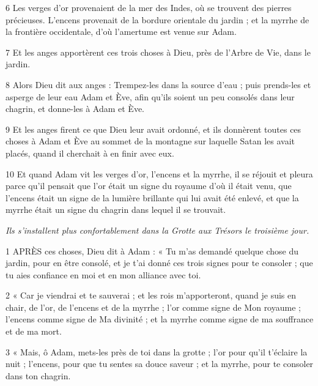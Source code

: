 \par 6 Les verges d'or provenaient de la mer des Indes, où se trouvent des pierres précieuses. L'encens provenait de la bordure orientale du jardin ; et la myrrhe de la frontière occidentale, d'où l'amertume est venue sur Adam.

\par 7 Et les anges apportèrent ces trois choses à Dieu, près de l'Arbre de Vie, dans le jardin.

\par 8 Alors Dieu dit aux anges : Trempez-les dans la source d'eau ; puis prends-les et asperge de leur eau Adam et Ève, afin qu'ils soient un peu consolés dans leur chagrin, et donne-les à Adam et Ève.

\par 9 Et les anges firent ce que Dieu leur avait ordonné, et ils donnèrent toutes ces choses à Adam et Ève au sommet de la montagne sur laquelle Satan les avait placés, quand il cherchait à en finir avec eux.

\par 10 Et quand Adam vit les verges d'or, l'encens et la myrrhe, il se réjouit et pleura parce qu'il pensait que l'or était un signe du royaume d'où il était venu, que l'encens était un signe de la lumière brillante qui lui avait été enlevé, et que la myrrhe était un signe du chagrin dans lequel il se trouvait.


\par \textit{Ils s'installent plus confortablement dans la Grotte aux Trésors le troisième jour.}

\par 1 APRÈS ces choses, Dieu dit à Adam : « Tu m'as demandé quelque chose du jardin, pour en être consolé, et je t'ai donné ces trois signes pour te consoler ; que tu aies confiance en moi et en mon alliance avec toi.

\par 2 « Car je viendrai et te sauverai ; et les rois m'apporteront, quand je suis en chair, de l'or, de l'encens et de la myrrhe ; l'or comme signe de Mon royaume ; l'encens comme signe de Ma divinité ; et la myrrhe comme signe de ma souffrance et de ma mort.

\par 3 « Mais, ô Adam, mets-les près de toi dans la grotte ; l'or pour qu'il t'éclaire la nuit ; l'encens, pour que tu sentes sa douce saveur ; et la myrrhe, pour te consoler dans ton chagrin.

